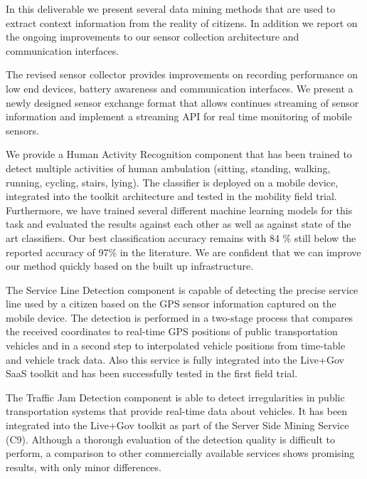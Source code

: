 \documentclass[external]{20120615_deliverable_template_ukob}
\theoremstyle{definition}
\begin{document}
\begin{LGExecutiveSummary}
\vspace{10pt} 

In this deliverable we present several data mining methods that are
used to extract context information from the reality of citizens.  In
addition we report on the ongoing improvements to our sensor
collection architecture and communication interfaces.

The revised sensor collector provides improvements on recording
performance on low end devices, battery awareness and communication
interfaces. We present a newly designed sensor exchange format that
allows continues streaming of sensor information and implement a
streaming API for real time monitoring of mobile sensors.

We provide a Human Activity Recognition component that has been
trained to detect multiple activities of human ambulation (sitting,
standing, walking, running, cycling, stairs, lying). The classifier is
deployed on a mobile device, integrated into the toolkit architecture
and tested in the mobility field trial.  Furthermore, we have trained
several different machine learning models for this task and evaluated
the results against each other as well as against state of the art
classifiers. Our best classification accuracy remains with 84 \% still
below the reported accuracy of 97\% in the literature. We are
confident that we can improve our method quickly based on the built up
infrastructure.

The Service Line Detection component is capable of detecting the
precise service line used by a citizen based on the GPS sensor
information captured on the mobile device. The detection is performed
in a two-stage process that compares the received coordinates to
real-time GPS positions of public transportation vehicles and in a
second step to interpolated vehicle positions from time-table and
vehicle track data. Also this service is fully integrated into the
Live+Gov SaaS toolkit and has been successfully tested in the first
field trial.

The Traffic Jam Detection component is able to detect irregularities
in public transportation systems that provide real-time data about
vehicles. It has been integrated into the Live+Gov toolkit as part of
the Server Side Mining Service (C9). Although a thorough evaluation of
the detection quality is difficult to perform, a comparison to other
commercially available services shows promising results, with only
minor differences.


\end{LGExecutiveSummary}
\end{document}
